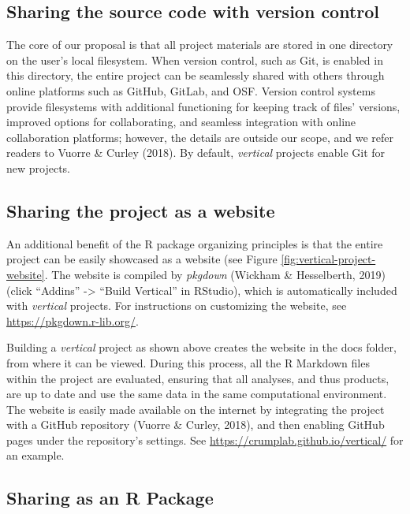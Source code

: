 \documentclass[
  english,
  jou,floatsintext]{apa6}
\begin{document}
\hypertarget{sharing-the-source-code-with-version-control}{%
\subsection{Sharing the source code with version control}\label{sharing-the-source-code-with-version-control}}

The core of our proposal is that all project materials are stored in one directory on the user's local filesystem. When version control, such as Git, is enabled in this directory, the entire project can be seamlessly shared with others through online platforms such as GitHub, GitLab, and OSF. Version control systems provide filesystems with additional functioning for keeping track of files' versions, improved options for collaborating, and seamless integration with online collaboration platforms; however, the details are outside our scope, and we refer readers to Vuorre \& Curley (2018). By default, \emph{vertical} projects enable Git for new projects.

\hypertarget{sharing-the-project-as-a-website}{%
\subsection{Sharing the project as a website}\label{sharing-the-project-as-a-website}}

An additional benefit of the R package organizing principles is that the entire project can be easily showcased as a website (see Figure \ref{fig:vertical-project-website}. The website is compiled by \emph{pkgdown} (Wickham \& Hesselberth, 2019) (click ``Addins'' -\textgreater{} ``Build Vertical'' in RStudio), which is automatically included with \emph{vertical} projects. For instructions on customizing the website, see \url{https://pkgdown.r-lib.org/}.

Building a \emph{vertical} project as shown above creates the website in the docs folder, from where it can be viewed. During this process, all the R Markdown files within the project are evaluated, ensuring that all analyses, and thus products, are up to date and use the same data in the same computational environment. The website is easily made available on the internet by integrating the project with a GitHub repository (Vuorre \& Curley, 2018), and then enabling GitHub pages under the repository's settings. See \url{https://crumplab.github.io/vertical/} for an example.

\hypertarget{sharing-as-an-r-package}{%
\subsection{Sharing as an R Package}\label{sharing-as-an-r-package}}
\end{document}
